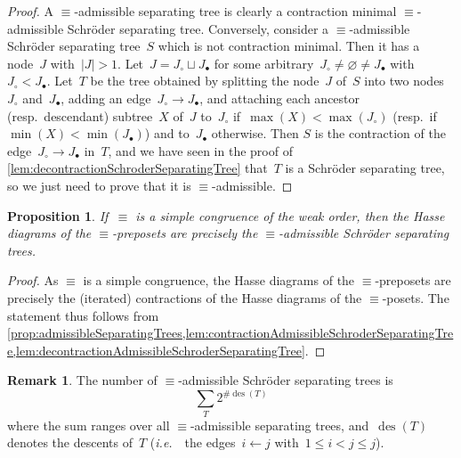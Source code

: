 \documentclass{amsart}
\newtheorem{proposition}[theorem]{Proposition}
\theoremstyle{definition}
\newtheorem{remark}[theorem]{Remark}
\DeclareMathOperator{\des}{des} %
\newcommand{\ie}{\textit{i.e.}~} %
\newcommand{\vincent}[1]{\todo[color=blue!30]{#1 \\ \hfill --- V.}}
\begin{document}
\begin{proof}
A $\equiv$-admissible separating tree is clearly a contraction minimal $\equiv$-admissible Schröder separating tree.
Conversely, consider a $\equiv$-admissible Schröder separating tree~$S$ which is not contraction minimal.
Then it has a node~$J$ with~$|J| > 1$.
Let~$J = J_\circ \sqcup J_\bullet$ for some arbitrary~$J_\circ \ne \varnothing \ne J_\bullet$ with~$J_\circ < J_\bullet$.
Let~$T$ be the tree obtained by splitting the node~$J$ of~$S$ into two nodes~$J_\circ$ and~$J_\bullet$, adding an edge~$J_\circ \to J_\bullet$, and attaching each ancestor (resp.~descendant) subtree~$X$ of~$J$ to~$J_\circ$ if~$\max(X) < \max(J_\circ)$ (resp.~if~$\min(X) < \min(J_\bullet)$) and to~$J_\bullet$ otherwise.
Then $S$ is the contraction of the edge~$J_\circ \to J_\bullet$ in~$T$, and we have seen in the proof of \cref{lem:decontractionSchroderSeparatingTree} that~$T$ is a Schröder separating tree, so we just need to prove that it is $\equiv$-admissible.
\vincent{todo}
\end{proof}


\begin{proposition}
\label{prop:admissibleSchroderSeparatingTrees}
If~$\equiv$ is a simple congruence of the weak order, then the Hasse diagrams of the $\equiv$-preposets are precisely the $\equiv$-admissible Schröder separating trees.
\end{proposition}

\begin{proof}
As $\equiv$ is a simple congruence, the Hasse diagrams of the $\equiv$-preposets are precisely the (iterated) contractions of the Hasse diagrams of the $\equiv$-posets.
The statement thus follows from \cref{prop:admissibleSeparatingTrees,lem:contractionAdmissibleSchroderSeparatingTree,lem:decontractionAdmissibleSchroderSeparatingTree}.
\end{proof}

\begin{remark}
The number of $\equiv$-admissible Schröder separating trees is
\[
\sum_T 2^{\#\des(T)}
\]
where the sum ranges over all $\equiv$-admissible separating trees, and~$\des(T)$ denotes the descents of~$T$ (\ie~the edges~$i \leftarrow j$ with~$1 \le i < j \le j$).
\end{remark}

\end{document}
